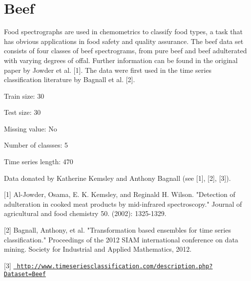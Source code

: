 \chapter{Beef}
\hypertarget{md_external_2data_2UCRArchive__2018_2Beef_2README}{}\label{md_external_2data_2UCRArchive__2018_2Beef_2README}
\label{md_external_2data_2UCRArchive__2018_2Beef_2README_autotoc_md21}%
%
 Food spectrographs are used in chemometrics to classify food types, a task that has obvious applications in food safety and quality assurance. The beef data set consists of four classes of beef spectrograms, from pure beef and beef adulterated with varying degrees of offal. Further information can be found in the original paper by Jowder et al. \mbox{[}1\mbox{]}. The data were first used in the time series classification literature by Bagnall et al. \mbox{[}2\mbox{]}.

Train size\+: 30

Test size\+: 30

Missing value\+: No

Number of classses\+: 5

Time series length\+: 470

Data donated by Katherine Kemsley and Anthony Bagnall (see \mbox{[}1\mbox{]}, \mbox{[}2\mbox{]}, \mbox{[}3\mbox{]}).

\mbox{[}1\mbox{]} Al-\/\+Jowder, Osama, E. K. Kemsley, and Reginald H. Wilson. "{}\+Detection of adulteration in cooked meat products by mid-\/infrared spectroscopy."{} Journal of agricultural and food chemistry 50. (2002)\+: 1325-\/1329.

\mbox{[}2\mbox{]} Bagnall, Anthony, et al. "{}\+Transformation based ensembles for time series classification."{} Proceedings of the 2012 SIAM international conference on data mining. Society for Industrial and Applied Mathematics, 2012.

\mbox{[}3\mbox{]} \href{http://www.timeseriesclassification.com/description.php?Dataset=Beef}{\texttt{ http\+://www.\+timeseriesclassification.\+com/description.\+php?\+Dataset=\+Beef}} 